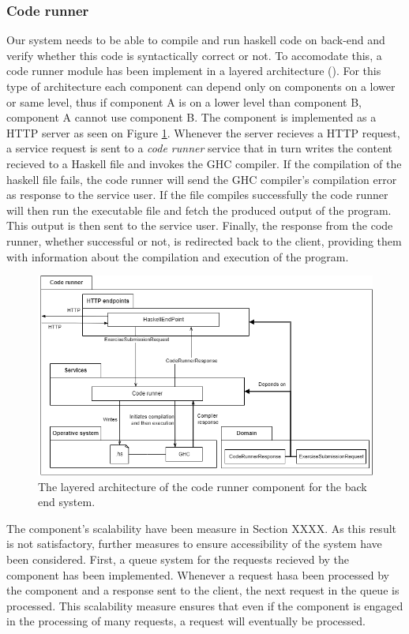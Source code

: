 \subsubsection{Code runner}
Our system needs to be able to compile and run haskell code on back-end and verify whether this code is syntactically correct or not.
To accomodate this, a code runner module has been implement in a layered architecture (\cite{røde aalborg}).
For this type of architecture each component can depend only on components on a lower or same level, thus if component A is on a lower level than component B, component A cannot use component B.
The component is implemented as a HTTP server as seen on Figure \ref{fig:code_runner}.
Whenever the server recieves a HTTP request, a service request is sent to a \textit{code runner} service that in turn writes the content recieved to a Haskell file and invokes the GHC compiler.
If the compilation of the haskell file fails, the code runner will send the GHC compiler's compilation error as response to the service user.
If the file compiles successfully the code runner will then run the executable file and fetch the produced output of the program.
This output is then sent to the service user.
Finally, the response from the code runner, whether successful or not, is redirected back to the client, providing them with information about the compilation and execution of the program.
\begin{figure}
    \centering
    \includegraphics[width=\textwidth,height=\textheight,keepaspectratio]{sections/Chapter 2/pics/P7 arch-Backend - HS compiler.drawio.png}
    \caption[]{The layered architecture of the code runner component for the back end system.}
    \label{fig:code_runner}
\end{figure}

The component's scalability have been measure in Section XXXX. As this result is not satisfactory, further measures to ensure accessibility of the system have been considered. 
First, a queue system for the requests recieved by the component has been implemented. 
Whenever a request hasa been processed by the component and a response sent to the client, the next request in the queue is processed. 
This scalability measure ensures that even if the component is engaged in the processing of many requests, a request will eventually be processed.

